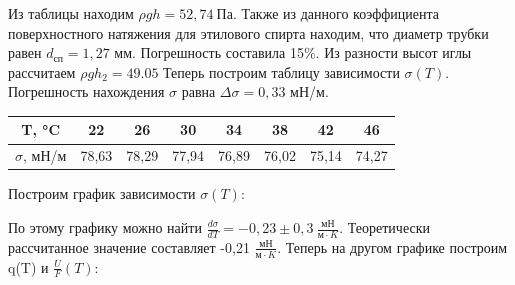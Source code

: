 \documentclass[a4paper, 12pt]{article}
\begin{document}
		Из таблицы находим $\rho gh = 52,74\: Па$. Также из данного коэффициента поверхностного натяжения для этилового спирта находим, что диаметр трубки равен $d_{сп}=1,27$ мм. Погрешность составила 15$\%$. Из разности высот иглы рассчитаем $\rho gh_2 = 49.05$ Теперь построим таблицу зависимости $\sigma (T)$. Погрешность нахождения $\sigma$ равна $\Delta \sigma = 0,33$ мН/м. 
		\begin{longtable}[H]{|c|c|c|c|c|c|c|c|}
			\hline
			T, °C & 22 & 26 & 30 & 34 & 38 & 42 & 46 \\
			\hline
			$\sigma$, мН/м & 78,63 & 78,29 & 77,94 & 76,89 & 76,02 & 75,14 & 74,27 \\
			\hline
		\end{longtable}
	
		Построим график зависимости $\sigma (T)$:
		
		\begin{figure}[h]
		\end{figure}
	
		По этому графику можно найти $\frac{d \sigma}{dT} = -0,23 \pm 0,3\: \frac{мН}{м \cdot K}$. Теоретически рассчитанное значение составляет -0,21 $\frac{мН}{м \cdot K}$. Теперь на другом графике построим q(T) и $\frac{U}{F} (T)$:
		\begin{figure}[h]
		\end{figure}
\end{document}
